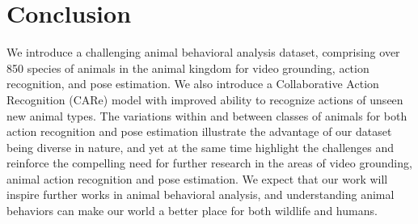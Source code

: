 \documentclass[10pt,twocolumn,letterpaper]{article}
\begin{document}
    \begin{table}[t]
        \centering
        \caption{Results of pose estimation}
        \label{table:pe}
        \vspace{-0.3cm}
    \vspace{-0.5cm}
    \end{table}
    
    
    
    \section{Conclusion}
    
    We introduce a challenging animal behavioral analysis dataset, comprising over 850 species of animals in the animal kingdom for video grounding, action recognition, and pose estimation. We also introduce a Collaborative Action Recognition (CARe) model with improved ability to recognize actions of unseen new animal types. The variations within and between classes of animals for both action recognition and pose estimation illustrate the advantage of our dataset being diverse in nature, and yet at the same time highlight the challenges and reinforce the compelling need for further research in the areas of video grounding, animal action recognition and pose estimation. We expect that our work will inspire further works in animal behavioral analysis, and understanding animal behaviors can make our world a better place for both wildlife and humans.
    
\end{document}
